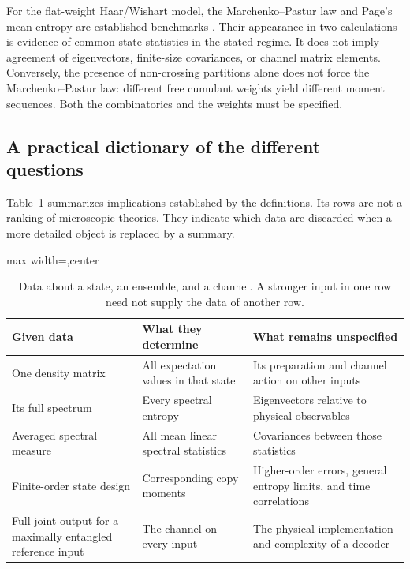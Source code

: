 \documentclass[11pt,letterpaper]{article}
\theoremstyle{plain}
\theoremstyle{definition}
\theoremstyle{remark}
\begin{document}
For the flat-weight Haar/Wishart model, the Marchenko--Pastur law and
Page's mean entropy are established benchmarks
\citep{marchenkopastur1967,page1993}. Their appearance in two calculations
is evidence of common state statistics in the stated regime. It does
not imply agreement of eigenvectors, finite-size covariances, or channel
matrix elements. Conversely, the presence of non-crossing partitions
alone does not force the Marchenko--Pastur law: different free cumulant
weights yield different moment sequences. Both the combinatorics and
the weights must be specified.

\subsection{A practical dictionary of the different questions}
\label{subsec11:dictionary}

Table~\ref{tab11:level_summary} summarizes implications established by
the definitions. Its rows are not a ranking of microscopic theories.
They indicate which data are discarded when a more detailed object is
replaced by a summary.

\begin{table}[tbp]
\centering
\caption{Data about a state, an ensemble, and a channel. A stronger
input in one row need not supply the data of another row.}
\label{tab11:level_summary}
\begin{adjustbox}{max width=\textwidth,center}
\begin{tabular}{p{}p{}p{}}
\toprule
Given data & What they determine & What remains unspecified \\
\midrule
One density matrix & All expectation values in that state & Its
preparation and channel action on other inputs \\[4pt]
Its full spectrum & Every spectral entropy & Eigenvectors relative to
physical observables \\[4pt]
Averaged spectral measure & All mean linear spectral statistics &
Covariances between those statistics \\[4pt]
Finite-order state design & Corresponding copy moments & Higher-order
errors, general entropy limits, and time correlations \\[4pt]
Full joint output for a maximally entangled reference input & The channel on every input & The physical
implementation and complexity of a decoder \\
\bottomrule
\end{tabular}
\end{adjustbox}
\end{table}
\end{document}
